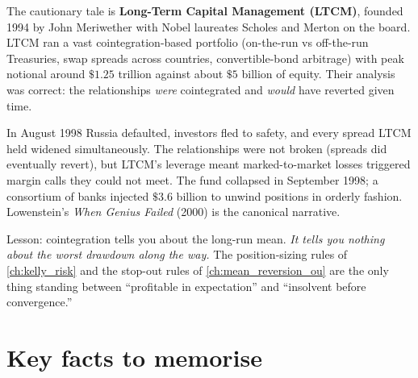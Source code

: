 \begin{pitfallbox}
\label{pitfall:ltcm}
The cautionary tale is \textbf{Long-Term Capital Management
(LTCM)}, founded 1994 by John Meriwether with Nobel laureates
Scholes and Merton on the board. LTCM ran a vast
cointegration-based portfolio (on-the-run vs off-the-run
Treasuries, swap spreads across countries, convertible-bond
arbitrage) with peak notional around $\$1.25$ trillion against
about $\$5$ billion of equity. Their analysis was correct: the
relationships \emph{were} cointegrated and \emph{would} have
reverted given time.

In August 1998 Russia defaulted, investors fled to safety, and
every spread LTCM held widened simultaneously. The relationships
were not broken (spreads did eventually revert), but LTCM's
leverage meant marked-to-market losses triggered margin calls
they could not meet. The fund collapsed in September 1998; a
consortium of banks injected $\$3.6$ billion to unwind positions
in orderly fashion. Lowenstein's \emph{When Genius Failed} (2000)
is the canonical narrative.

Lesson: cointegration tells you about the long-run mean.
\emph{It tells you nothing about the worst drawdown along the
way.} The position-sizing rules of \cref{ch:kelly_risk} and the
stop-out rules of \cref{ch:mean_reversion_ou} are the only thing
standing between ``profitable in expectation'' and ``insolvent
before convergence.''
\end{pitfallbox}

\section{Key facts to memorise}
\label{sec:ch10_keyfacts}

